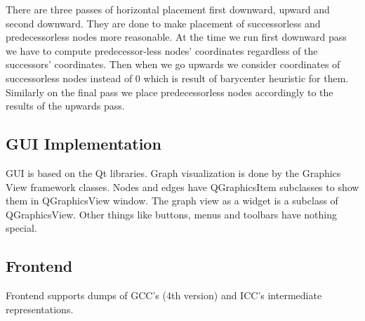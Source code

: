 \documentclass[11pt,a4paper]{article}
\begin{document}

There are three passes of horizontal placement first downward, upward and second downward. They are done to make placement of successorless and predecessorless nodes more reasonable. At the time we run first downward pass we have to compute predecessor-less nodes' coordinates regardless of the successors' coordinates. Then when we go upwards we consider coordinates of successorless nodes instead of 0 which is result of barycenter heuristic for them. Similarly on the final pass we place predecessorless nodes accordingly to the results of the upwards pass.

\subsection{GUI Implementation}
GUI is based on the Qt libraries. Graph visualization is done by the Graphics View framework classes. Nodes and edges have QGraphicsItem subclasses to show them in QGraphicsView window. The graph view as a widget is a subclass of QGraphicsView. Other things like buttons, menus and toolbars have nothing special.

\subsection{Frontend}
Frontend supports dumps of GCC's (4th version) and ICC's intermediate representations.
\end{document}

